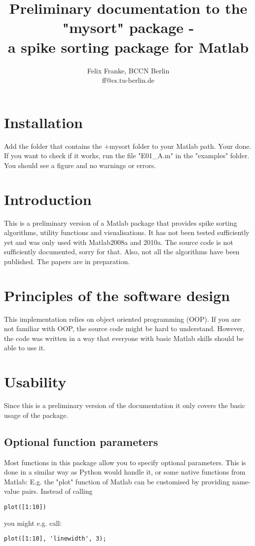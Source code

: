 \documentclass[11pt]{article} %
\title{Preliminary documentation to the "mysort" package -\\ a spike sorting package for Matlab}
\author{Felix Franke, BCCN Berlin\\ff@cs.tu-berlin.de}
\begin{document}
\maketitle

\section{Installation}

Add the folder that contains the +mysort folder to your Matlab path. Your done. If you want to check if it works, run the file "E01\_A.m" in the "examples" folder. You should see a figure and no warnings or errors.

\section{Introduction}

This is a preliminary version of a Matlab package that provides spike sorting algorithms, utility functions and visualisations. It has not been tested sufficiently yet and was only used with Matlab2008a and 2010a. The source code is not sufficiently documented, sorry for that. Also, not all the algorithms have been published. The papers are in preparation.


\section{Principles of the software design}

This implementation relies on object oriented programming (OOP). If you are not familiar with OOP, the source code might be hard to understand. However, the code was written in a way that everyone with basic Matlab skills should be able to use it.


\section{Usability}

 Since this is a preliminary version of the documentation it only covers the basic usage of the package.

\subsection{Optional function parameters}
Most functions in this package allow you to specify optional parameters. This is done in a similar way as Python would handle it, or some native functions from Matlab:
E.g. the "plot" function of Matlab can be customised by providing name-value pairs.
Instead of calling
\begin{lstlisting}
plot([1:10])
\end{lstlisting}
you might e.g. call:
\begin{lstlisting}
plot([1:10], 'linewidth', 3);
\end{lstlisting}
\end{document}
